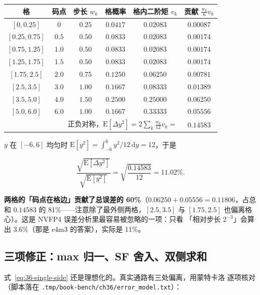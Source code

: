 \begin{center}
\footnotesize
\begin{tabular}{cccccc}
\toprule
格 & 码点 & 步长 $w_k$ & 格概率 & 格内二阶矩 $v_k$ & 贡献 $\frac{w_k}{6}v_k$ \\
\midrule
$[0,0.25]$   & $0$   & $0.25$ & $0.0417$ & $0.02083$ & $0.00087$ \\
$[0.25,0.75]$ & $0.5$ & $0.50$ & $0.0833$ & $0.02083$ & $0.00174$ \\
$[0.75,1.25]$ & $1.0$ & $0.50$ & $0.0833$ & $0.02083$ & $0.00174$ \\
$[1.25,1.75]$ & $1.5$ & $0.50$ & $0.0833$ & $0.02083$ & $0.00174$ \\
$[1.75,2.5]$  & $2.0$ & $0.75$ & $0.1250$ & $0.06250$ & $0.00781$ \\
$[2.5,3.5]$   & $3.0$ & $1.00$ & $0.1667$ & $0.08333$ & $0.01389$ \\
$[3.5,5.0]$   & $4.0$ & $1.50$ & $0.2500$ & $0.25000$ & $0.06250$ \\
$[5.0,6.0]$   & $6.0$ & $1.00$ & $0.1667$ & $0.33333$ & $0.05556$ \\
\midrule
\multicolumn{5}{r}{正负对称，$\mathrm{E}[\Delta y^2]=2\sum_k
  \frac{w_k}{12}v_k=$} & $\mathbf{0.14583}$ \\
\bottomrule
\end{tabular}
\end{center}

$y$ 在 $[-6,6]$ 均匀时 $\mathrm{E}[y^2] = \int_{-6}^{6} y^2/12\,\mathrm{d}y
= 12$，于是

\begin{equation}
  \frac{\sqrt{\mathrm{E}[\Delta y^2]}}{\sqrt{\mathrm{E}[y^2]}}
  = \sqrt{\frac{0.14583}{12}} = 11.02\%.
  \label{eq:36-single-side}
\end{equation}

\textbf{两格的「码点在格边」贡献了总误差的 60\%}（$0.06250+0.05556 =
0.11806$，占总和 $0.14583$ 的 81\%——注意除了最外侧两格，$[2.5,3.5]$ 与
$[1.75,2.5]$ 也偏离格心）。这是 NVFP4 误差分析里最容易被忽略的一项：只看
「相对步长 $2^{-3}$」会算出 3.6\%（那是 e4m3 的答案），实际是 11\%。

\subsection{三项修正：max 归一、SF 舍入、双侧求和}

式~\ref{eq:36-single-side} 还是理想化的。真实通路有三处偏离，用蒙特卡洛
逐项核对（脚本落在 \texttt{.tmp/\allowbreak book-bench/\allowbreak ch36/\allowbreak error\_model.txt}）：

